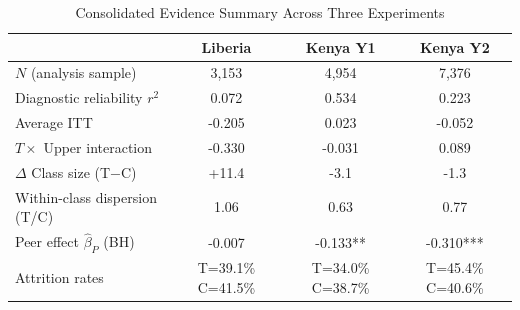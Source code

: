 \begin{table}[htbp]
\centering\small
\caption{Consolidated Evidence Summary Across Three Experiments}
\label{tab:consolidated}
\begin{tabular}{lccc}
\toprule
 & Liberia & Kenya Y1 & Kenya Y2 \\
\midrule
$N$ (analysis sample) & 3,153 & 4,954 & 7,376 \\
Diagnostic reliability $r^2$ & 0.072 & 0.534 & 0.223 \\
Average ITT & -0.205 & 0.023 & -0.052 \\
$T \times$ Upper interaction & -0.330 & -0.031 & 0.089 \\
$\Delta$ Class size (T$-$C) & +11.4 & -3.1 & -1.3 \\
Within-class dispersion (T/C) & 1.06 & 0.63 & 0.77 \\
Peer effect $\hat{\beta}_P$ (BH) & -0.007 & -0.133** & -0.310*** \\
Attrition rates & T=39.1\% C=41.5\% & T=34.0\% C=38.7\% & T=45.4\% C=40.6\% \\
\bottomrule
\end{tabular}
\par\smallskip{}
\end{table}